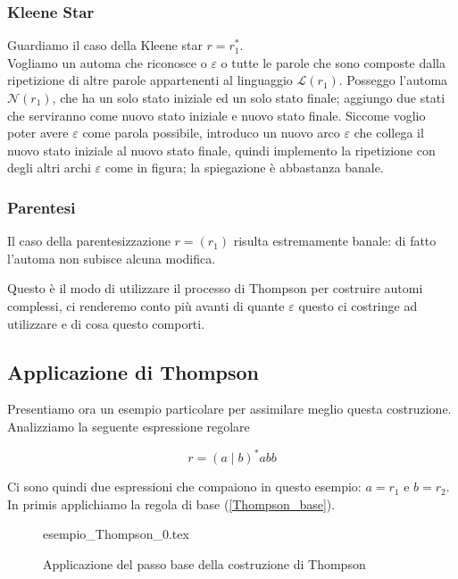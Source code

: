 \documentclass[class=book, crop=false, oneside, 12pt]{standalone}
\begin{document}
\subsubsection{Kleene Star}
Guardiamo il caso della Kleene star \(r = r_1^*\).\\
Vogliamo un automa che riconosce o \(\varepsilon\) o tutte le parole che sono composte dalla ripetizione di altre parole appartenenti al linguaggio \(\mathcal{L}(r_1)\).
Posseggo l’automa \(\mathcal{N}(r_1)\), che ha un solo stato iniziale ed un solo stato finale; aggiungo due stati che serviranno come nuovo stato iniziale e nuovo stato finale.
Siccome voglio poter avere \(\varepsilon\) come parola possibile, introduco un nuovo arco \(\varepsilon\) che collega il nuovo stato iniziale al nuovo stato finale, quindi implemento la ripetizione con degli altri archi \(\varepsilon\) come in figura; la spiegazione è abbastanza banale.

\subsubsection{Parentesi}
Il caso della parentesizzazione \(r = ( r_1 )\) risulta estremamente banale: di fatto l'automa non subisce alcuna modifica.

Questo è il modo di utilizzare il processo di Thompson per costruire automi complessi, ci renderemo conto più avanti di quante \(\varepsilon\) questo ci costringe ad utilizzare e di cosa questo comporti.

\subsection{Applicazione di Thompson}
Presentiamo ora un esempio particolare per assimilare meglio questa costruzione. Analizziamo la seguente espressione regolare

\begin{equation}
    r = (a \mid b)^\ast abb
\end{equation}

\noindent Ci sono quindi due espressioni che compaiono in questo esempio: \(a = r_1\) e \(b = r_2\).
In primis applichiamo la regola di base (\ref{Thompson_base}).

\begin{figure}
    \centering
    {esempio_Thompson_0.tex}
    \caption{Applicazione del passo base della costruzione di Thompson}
    \label{esempio_Thompson_0}
\end{figure}
\end{document}
